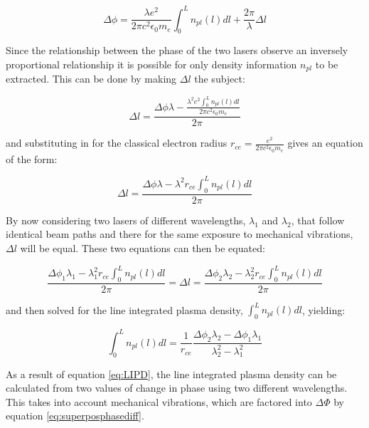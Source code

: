 \documentclass[12pt,a4paper,oneside]{report}
\begin{document}
\begin{equation}
	\Delta\phi = \frac{\lambda e^{2}}{2 \pi c^{2} \epsilon_{0} m_{e}} \int_{0}^{L} n_{pl} (l) dl + \frac{2\pi}{\lambda} \Delta l
	\label{eq:heterophasediff}
\end{equation}

Since the relationship between the phase of the two lasers observe an inversely proportional relationship it is possible for only density information $n_{pl}$ to be extracted. This can be done by making $\Delta l$ the subject:

\begin{equation}
	\Delta l = \frac{\Delta\phi\lambda - \frac{\lambda^{2} e^{2} \int_{0}^{L} n_{pl} (l) dl }{2 \pi c^{2} \epsilon_{0} m_{e}}}{2 \pi} 
	\label{eq:deltal}
\end{equation}

and substituting in for the classical electron radius $r_{ce} = \frac{e^{2}}{2 \pi c^{2} \epsilon_{0} m_{e}}$ gives an equation of the form:

\begin{equation}
	\Delta l = \frac{\Delta\phi\lambda - \lambda^{2} r_{ce} \int_{0}^{L} n_{pl} (l) dl}{2 \pi}  
	\label{eq:deltalrce}
\end{equation}

By now considering two lasers of different wavelengths, $\lambda _{1}$ and $\lambda _{2}$, that follow identical beam paths and there for the same exposure to mechanical vibrations, $\Delta l$ will be equal. These two equations can then be equated:

\begin{equation}
	\frac{\Delta\phi _{1}\lambda _{1} - \lambda _{1}^{2} r_{ce} \int_{0}^{L} n_{pl} (l) dl}{2 \pi}  = \Delta l = \frac{\Delta\phi _{2}\lambda_{2} - \lambda _{2}^{2} r_{ce} \int_{0}^{L} n_{pl} (l) dl}{2 \pi}  	\label{eq:deltalequate}
\end{equation}

and then solved for the line integrated plasma density, $\int_{0}^{L} n_{pl} (l) dl$, yielding:

\begin{equation}
\int_{0}^{L} n_{pl} (l) dl = \frac{1}{r_{ce}} \frac{\Delta\phi _{2} \lambda _{2} - \Delta\phi _{1} \lambda _{1}}{\lambda _{2}^{2} - \lambda _{1}^{2}}	
    \label{eq:LIPD}
\end{equation}

As a result of equation \ref{eq:LIPD}, the line integrated plasma density can be calculated from two values of change in phase using two different wavelengths. This takes into account mechanical vibrations, which are factored into $\Delta \Phi$ by equation \ref{eq:superposphasediff}.
\end{document}
